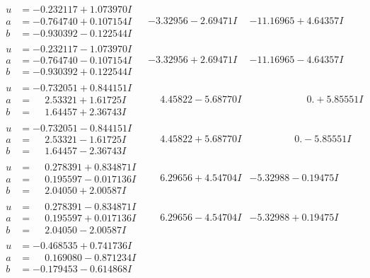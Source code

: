 \documentclass[1p]{elsarticle_modified}
\theoremstyle{definition}
\begin{document}
$$\begin{array}{c|c|c}
\begin{aligned}
u &= -0.232117 + 1.073970 I \\
a &= -0.764740 + 0.107154 I \\
b &= -0.930392 - 0.122544 I\end{aligned}
 & -3.32956 - 2.69471 I & -11.16965 + 4.64357 I \\ \hline\begin{aligned}
u &= -0.232117 - 1.073970 I \\
a &= -0.764740 - 0.107154 I \\
b &= -0.930392 + 0.122544 I\end{aligned}
 & -3.32956 + 2.69471 I & -11.16965 - 4.64357 I \\ \hline\begin{aligned}
u &= -0.732051 + 0.844151 I \\
a &= \phantom{-}2.53321 + 1.61725 I \\
b &= \phantom{-}1.64457 + 2.36743 I\end{aligned}
 & \phantom{-}4.45822 - 5.68770 I & \phantom{-0.000000 -}0. + 5.85551 I \\ \hline\begin{aligned}
u &= -0.732051 - 0.844151 I \\
a &= \phantom{-}2.53321 - 1.61725 I \\
b &= \phantom{-}1.64457 - 2.36743 I\end{aligned}
 & \phantom{-}4.45822 + 5.68770 I & \phantom{-0.000000 } 0. - 5.85551 I \\ \hline\begin{aligned}
u &= \phantom{-}0.278391 + 0.834871 I \\
a &= \phantom{-}0.195597 - 0.017136 I \\
b &= \phantom{-}2.04050 + 2.00587 I\end{aligned}
 & \phantom{-}6.29656 + 4.54704 I & -5.32988 - 0.19475 I \\ \hline\begin{aligned}
u &= \phantom{-}0.278391 - 0.834871 I \\
a &= \phantom{-}0.195597 + 0.017136 I \\
b &= \phantom{-}2.04050 - 2.00587 I\end{aligned}
 & \phantom{-}6.29656 - 4.54704 I & -5.32988 + 0.19475 I \\ \hline\begin{aligned}
u &= -0.468535 + 0.741736 I \\
a &= \phantom{-}0.169080 - 0.871234 I \\
b &= -0.179453 - 0.614868 I\end{aligned}

\end{array}$$
\end{document}
